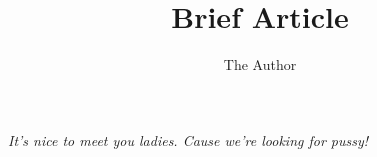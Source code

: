 \documentclass[]{article} %
\title{Brief Article}
\author{The Author}
\begin{document}

\setcounter{page}{2}

\newpage{}
\thispagestyle{empty}

\vspace*{100pt}
\begin{flushright}
	\textit{It's nice to meet you ladies. Cause we're looking for pussy!}
\end{flushright}

\newpage{}


\tableofcontents














\end{document}
